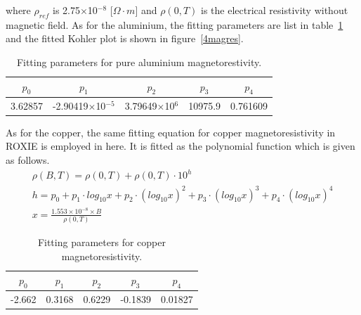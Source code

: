 where $\rho_{ref}$ is 2.75$\times$10$^{-8}$ [$\Omega\cdot m$] and $\rho(0, T)$ is the electrical resistivity without magnetic field.
As for the aluminium, the fitting parameters are list in table~\ref{almag} and the fitted Kohler plot is shown in figure~\ref{4magres}.
\begin{table}[H]
 \centering
 \begin{tabular}{ccccc} \hline \hline
  $p_0$ & $p_1$ & $p_2$ & $p_3$ & $p_4$ \\ \hline
  3.62857 & -2.90419$\times$10$^{-5}$ & 3.79649$\times$10$^6$ & 10975.9 & 0.761609 \\ \hline \hline
 \end{tabular}
 \caption{Fitting parameters for pure aluminium magnetorestivity.}
 \label{almag}
\end{table}

As for the copper, the same fitting equation for copper magnetoresistivity in ROXIE is employed in here.
It is fitted as the polynomial function which is given as follows.
\begin{gather}
 \rho(B, T) = \rho(0, T) + \rho(0, T) \cdot 10^h \nonumber \\
 h = p_0 + p_1 \cdot log_{10}x + p_2 \cdot (log_{10}x)^2 + p_3 \cdot (log_{10}x)^3 + p_4 \cdot (log_{10}x)^4 \nonumber \\
 x = \frac{1.553\times 10^{-8} \times B}{\rho(0, T)} \nonumber 
\end{gather}
\begin{table}[H]
 \centering
 \begin{tabular}{ccccc} \hline \hline
  $p_0$ & $p_1$ & $p_2$ & $p_3$ & $p_4$ \\ \hline
  -2.662 & 0.3168 & 0.6229 & -0.1839 & 0.01827 \\ \hline \hline
 \end{tabular}
 \caption{Fitting parameters for copper magnetoresistivity.}
 \label{cumag}
\end{table}

